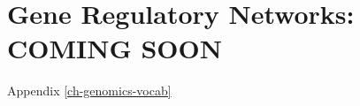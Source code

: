 \chapter{Gene Regulatory Networks: COMING SOON}
\label{ch_gene_reg_net}

Appendix \ref{ch-genomics-vocab}